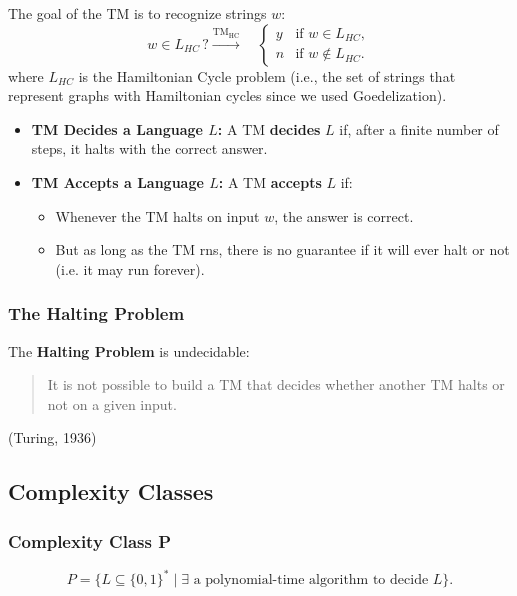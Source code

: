 \begin{example}
    The goal of the TM is to recognize strings $w$:
    \[
    w \in L_{HC} \, ? \overset{\text{TM}_{\text{HC}}}{\rightarrow} 
    \quad
    \begin{cases}
    y & \text{if } w \in L_{HC}, \\
    n & \text{if } w \notin L_{HC}.
    \end{cases}
    \]    
    where $L_{HC}$ is the Hamiltonian Cycle problem (i.e., the set of strings that represent graphs with Hamiltonian cycles since we used Goedelization).
    \begin{itemize}
        \item \textbf{TM Decides a Language $L$:} A TM \textbf{decides} $L$ if, after a finite number of steps, it halts with the correct answer.
        
        \item \textbf{TM Accepts a Language $L$:} A TM \textbf{accepts} $L$ if:
        \begin{itemize}
            \item Whenever the TM halts on input $w$, the answer is correct.
            \item But as long as the TM rns, there is no guarantee if it will ever halt or not (i.e. it may run forever).
        \end{itemize}
    \end{itemize}
\end{example}

\subsubsection{The Halting Problem}
\begin{definition}
    The \textbf{Halting Problem} is undecidable:
    \begin{quote}
    It is not possible to build a TM that decides whether another TM halts or not on a given input.
    \end{quote}
    (Turing, 1936)
\end{definition}

\subsection{Complexity Classes}
\subsubsection{Complexity Class P}
\begin{definition}
    \[
P = \{ L \subseteq \{0,1\}^* \mid \text{$\exists$ a polynomial-time algorithm to decide } L \}.
\]
\end{definition}

